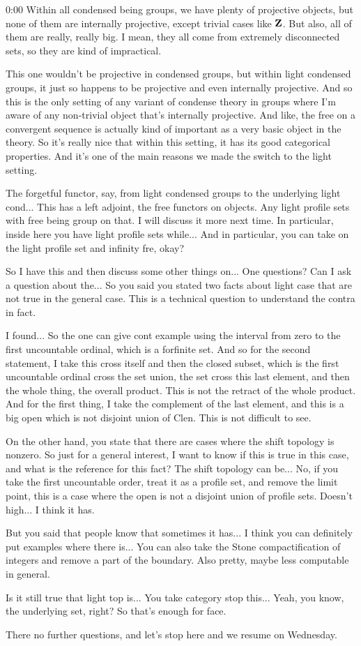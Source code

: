 \begin{unfinished}{0:00}
Within all condensed being groups, we have plenty of projective objects, but none of them are internally projective, except trivial cases like $\mathbf Z$. But also, all of them are really, really big. I mean, they all come from extremely disconnected sets, so they are kind of impractical.

This one wouldn't be projective in condensed groups, but within light condensed groups, it just so happens to be projective and even internally projective. And so this is the only setting of any variant of condense theory in groups where I'm aware of any non-trivial object that's internally projective. And like, the free on a convergent sequence is actually kind of important as a very basic object in the theory. So it's really nice that within this setting, it has its good categorical properties. And it's one of the main reasons we made the switch to the light setting.

The forgetful functor, say, from light condensed groups to the underlying light cond... This has a left adjoint, the free functors on objects. Any light profile sets with free being group on that. I will discuss it more next time. In particular, inside here you have light profile sets while... And in particular, you can take on the light profile set and infinity fre, okay?

So I have this and then discuss some other things on... One questions? Can I ask a question about the... So you said you stated two facts about light case that are not true in the general case. This is a technical question to understand the contra in fact.

I found... So the one can give cont example using the interval from zero to the first uncountable ordinal, which is a forfinite set. And so for the second statement, I take this cross itself and then the closed subset, which is the first uncountable ordinal cross the set union, the set cross this last element, and then the whole thing, the overall product. This is not the retract of the whole product. And for the first thing, I take the complement of the last element, and this is a big open which is not disjoint union of Clen. This is not difficult to see.

On the other hand, you state that there are cases where the shift topology is nonzero. So just for a general interest, I want to know if this is true in this case, and what is the reference for this fact? The shift topology can be... No, if you take the first uncountable order, treat it as a profile set, and remove the limit point, this is a case where the open is not a disjoint union of profile sets. Doesn't high... I think it has.

But you said that people know that sometimes it has... I think you can definitely put examples where there is... You can also take the Stone compactification of integers and remove a part of the boundary. Also pretty, maybe less computable in general.

Is it still true that light top is... You take category stop this... Yeah, you know, the underlying set, right? So that's enough for face.

There no further questions, and let's stop here and we resume on Wednesday.
\end{unfinished}